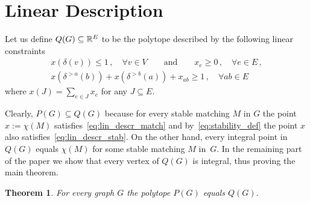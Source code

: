 \documentclass[3p,times]{elsarticle}
\newtheorem{theorem}[fact]{Theorem}
\begin{document}
\section{Linear Description}
Let us define $Q(G)\subseteq\mathbb{R}^E$ to be the polytope described by the
following linear constraints
\begin{align}
  x(\delta(v)) \leq 1\,,\quad \forall v \in V\qquad \text{and} \qquad x_e \geq 0\,,\quad \forall e \in E\,,\label{eq:lin_descr_match}\\
  x(\delta^{>a}(b))+ x(\delta^{>b}(a)) + x_{ab} \geq 1\,, \quad \forall ab \in E \label{eq:lin_descr_stab}
\end{align}
where $x(J) = \sum_{e \in J} x_e$ for any $J \subseteq E$.

Clearly, $P(G)\subseteq Q(G)$ because for every stable matching $M$ in
$G$ the point $x:=\chi(M)$ satisfies~\eqref{eq:lin_descr_match} and
by~\eqref{eq:stability_def} the point $x$ also
satisfies~\eqref{eq:lin_descr_stab}. On the other hand, every integral
point in $Q(G)$ equals $\chi(M)$ for some stable matching $M$
in~$G$. In the remaining part of the paper we show that every vertex
of $Q(G)$ is integral, thus proving the main theorem.

\begin{theorem}
	For every graph $G$ the polytope $P(G)$ equals $Q(G)$.
\end{theorem}
\end{document}
